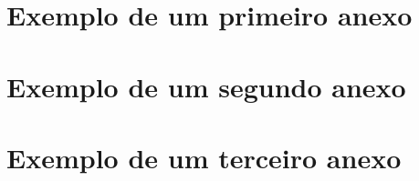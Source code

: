 \documentclass[
12pt,				%
openright,			%
oneside,
a4paper,			%
english,			%
french,				%
spanish,			%
brazil,				%
]{abntex2}
\begin{document}
	\begin{anexosenv}
		
		\partanexos
		
		\chapter{Exemplo de um primeiro anexo}
		
		
		\chapter{Exemplo de um segundo anexo}
		
		
		
		\chapter{Exemplo de um terceiro anexo}
		
		
		
	\end{anexosenv}
	
	
	
	\printindex
	
	
\end{document}
